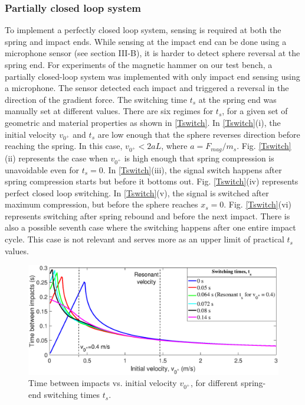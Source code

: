 \documentclass[letterpaper, 10 pt, conference]{ieeeconf}  %
\begin{document}
\subsubsection{Partially closed loop system}

To implement a perfectly closed loop system, sensing is required at both the spring and impact ends. While sensing at the impact end can be done using a microphone sensor (see section III-B), it is harder to detect sphere reversal at the spring end. For experiments of the magnetic hammer on our test bench, a partially closed-loop system was implemented with only impact end sensing using a microphone. The sensor detected each impact and triggered a reversal in the direction of the gradient force. The switching time $t_s$ at the spring end was manually set at different values. There are six regimes for $t_s$, for a given set of geometric and material properties as shown in \cref{Tswitch}. In \cref{Tswitch}(i), the initial velocity $v_{0^+}$ and $t_s$ are low enough that the sphere reverses direction before reaching the spring. In this case, $v_{0^+} < 2aL$, where $a=F_{mag}/m_s$. Fig. \ref{Tswitch}(ii) represents the case when $v_{0^+}$ is high enough that spring compression is unavoidable even for $t_s = 0$. In \cref{Tswitch}(iii), the signal switch happens after spring compression starts but before it bottoms out. Fig. \ref{Tswitch}(iv) represents perfect closed loop switching. In \cref{Tswitch}(v), the signal is switched after maximum compression, but before the sphere reaches $x_s=0$. Fig. \ref{Tswitch}(vi) represents switching after spring rebound and before the next impact. There is also a possible seventh case where the switching happens after one entire impact cycle. This case is not relevant and serves more as an upper limit of practical $t_s$ values. 


\begin{figure}
	\includegraphics[width=\linewidth]{delTvsVop_R3.eps}
	\caption{Time between impacts vs. initial velocity $v_{0^+}$, for different spring-end switching times $t_s$.}
	\label{delTvsVop}
\end{figure}
\end{document}
